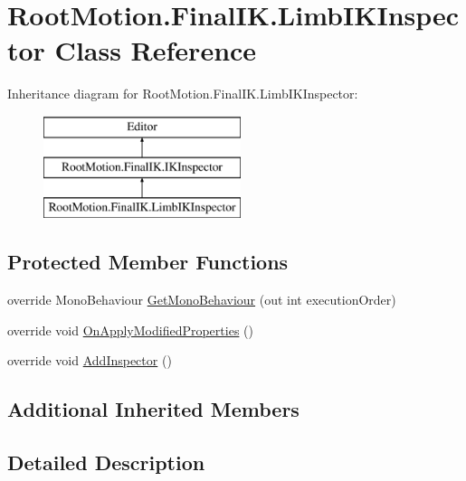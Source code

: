 \hypertarget{class_root_motion_1_1_final_i_k_1_1_limb_i_k_inspector}{}\section{Root\+Motion.\+Final\+I\+K.\+Limb\+I\+K\+Inspector Class Reference}
\label{class_root_motion_1_1_final_i_k_1_1_limb_i_k_inspector}
Inheritance diagram for Root\+Motion.\+Final\+I\+K.\+Limb\+I\+K\+Inspector\+:\begin{figure}[H]
\begin{center}
\leavevmode
\includegraphics[height=3.000000cm]{class_root_motion_1_1_final_i_k_1_1_limb_i_k_inspector}
\end{center}
\end{figure}
\subsection*{Protected Member Functions}
\begin{DoxyCompactItemize}
\item 
override Mono\+Behaviour \mbox{\hyperlink{class_root_motion_1_1_final_i_k_1_1_limb_i_k_inspector_a0ce61fd92732d883e1a8ea693e535756}{Get\+Mono\+Behaviour}} (out int execution\+Order)
\item 
override void \mbox{\hyperlink{class_root_motion_1_1_final_i_k_1_1_limb_i_k_inspector_a0811b1bc9ecabe082219a89830c086b2}{On\+Apply\+Modified\+Properties}} ()
\item 
override void \mbox{\hyperlink{class_root_motion_1_1_final_i_k_1_1_limb_i_k_inspector_ae12aea2335d772442ac52560d85a702b}{Add\+Inspector}} ()
\end{DoxyCompactItemize}
\subsection*{Additional Inherited Members}


\subsection{Detailed Description}


